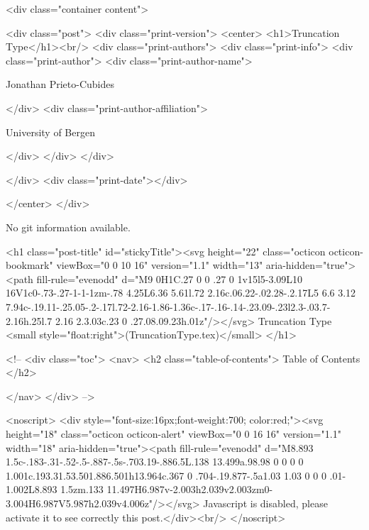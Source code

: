       <div class="container content">
        







<div class="post">
  <div class="print-version">
    <center>
      <h1>Truncation Type</h1><br/>
        <div class="print-authors">
          <div class="print-info">
            <div class="print-author">
              <div class="print-author-name">
                
                  Jonathan Prieto-Cubides
                
              </div>
              <div class="print-author-affiliation">
                
                  University of Bergen
                
                </div>
            </div>
          </div>
          
          
        </div>
        <div class="print-date"></div>
        
        
    </center>
  </div>

  
  No git information available.
  

  <h1 class="post-title" id="stickyTitle"><svg height="22" class="octicon octicon-bookmark" viewBox="0 0 10 16" version="1.1" width="13" aria-hidden="true"><path fill-rule="evenodd" d="M9 0H1C.27 0 0 .27 0 1v15l5-3.09L10 16V1c0-.73-.27-1-1-1zm-.78 4.25L6.36 5.61l.72 2.16c.06.22-.02.28-.2.17L5 6.6 3.12 7.94c-.19.11-.25.05-.2-.17l.72-2.16-1.86-1.36c-.17-.16-.14-.23.09-.23l2.3-.03.7-2.16h.25l.7 2.16 2.3.03c.23 0 .27.08.09.23h.01z"/></svg> Truncation Type <small style="float:right">(TruncationType.tex)</small>
  </h1>

  <!-- 
  <div class="toc">
    <nav>
    <h2 class="table-of-contents"> Table of Contents </h2>
      

    </nav>
  </div>
   -->

  <noscript>
  <div style="font-size:16px;font-weight:700; color:red;"><svg height="18" class="octicon octicon-alert" viewBox="0 0 16 16" version="1.1" width="18" aria-hidden="true"><path fill-rule="evenodd" d="M8.893 1.5c-.183-.31-.52-.5-.887-.5s-.703.19-.886.5L.138 13.499a.98.98 0 0 0 0 1.001c.193.31.53.501.886.501h13.964c.367 0 .704-.19.877-.5a1.03 1.03 0 0 0 .01-1.002L8.893 1.5zm.133 11.497H6.987v-2.003h2.039v2.003zm0-3.004H6.987V5.987h2.039v4.006z"/></svg> Javascript is disabled, please activate it to see correctly this post.</div><br/>
  </noscript>

